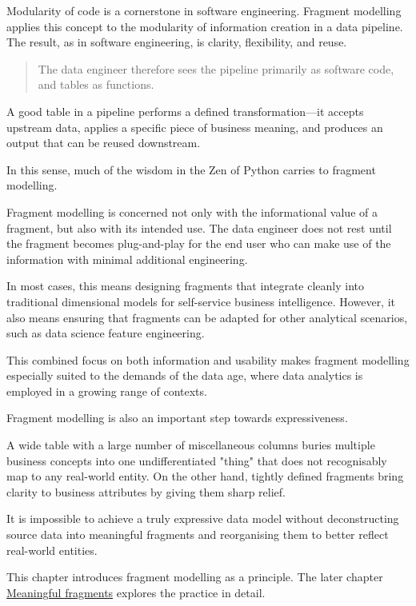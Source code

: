 \documentclass[10pt,openany,10pt]{book}
\begin{document}
Modularity of code is a cornerstone in software engineering. Fragment
modelling applies this concept to the modularity of information creation
in a data pipeline. The result, as in software engineering, is clarity,
flexibility, and reuse.

\begin{quote}
The data engineer therefore sees the pipeline primarily as software
code, and tables as functions.
\end{quote}

A good table in a pipeline performs a defined transformation---it
accepts upstream data, applies a specific piece of business meaning, and
produces an output that can be reused downstream.

In this sense, much of the wisdom in the Zen of Python carries to
fragment modelling.

Fragment modelling is concerned not only with the informational value of
a fragment, but also with its intended use. The data engineer does not
rest until the fragment becomes plug-and-play for the end user who can
make use of the information with minimal additional engineering.

In most cases, this means designing fragments that integrate cleanly
into traditional dimensional models for self-service business
intelligence. However, it also means ensuring that fragments can be
adapted for other analytical scenarios, such as data science feature
engineering.

This combined focus on both information and usability makes fragment
modelling especially suited to the demands of the data age, where data
analytics is employed in a growing range of contexts.

Fragment modelling is also an important step towards expressiveness.

A wide table with a large number of miscellaneous columns buries
multiple business concepts into one undifferentiated "thing" that does
not recognisably map to any real-world entity. On the other hand,
tightly defined fragments bring clarity to business attributes by giving
them sharp relief.

It is impossible to achieve a truly expressive data model without
deconstructing source data into meaningful fragments and reorganising
them to better reflect real-world entities.

This chapter introduces fragment modelling as a principle. The later
chapter
\hyperref[docs-creating-information-meaningful-fragments]{Meaningful
fragments} explores the practice in detail.
\end{document}
